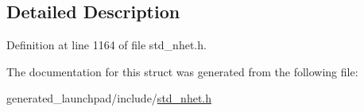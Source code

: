 \subsection{Detailed Description}


Definition at line 1164 of file std\+\_\+nhet.\+h.



The documentation for this struct was generated from the following file\+:\begin{DoxyCompactItemize}
\item 
generated\+\_\+launchpad/include/\mbox{\hyperlink{std__nhet_8h}{std\+\_\+nhet.\+h}}\end{DoxyCompactItemize}
